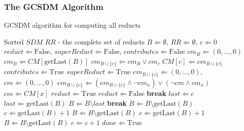 \documentclass[authoryear,11pt]{elsarticle}
\begin{document}
\subsubsection{The GCSDM Algorithm}	
	
	\begin{algorithm}
	\caption{GCSDM algorithm for computing all reducts}
	\label{alg:GCSDM}
	\begin{algorithmic}[1]
	  \Require Sorted $SDM$
      \Ensure $RR$ - the complete set of reducts
	  \State $B \Leftarrow \emptyset$, $RR \Leftarrow \emptyset$, $c \Leftarrow 0$
	  \State $reduct \Leftarrow \mathrm{False}$, $superReduct \Leftarrow \mathrm{False}$, 
	  		 $contributes \Leftarrow \mathrm{False}$
	  	\label{line:singleT}
	  		\State $cm_B \Leftarrow (0,...,0)$
	  	\Else
	  		\State $cm_B \Leftarrow CM[\mathrm{getLast}(B)]$
	  	\EndIf
	  	\State $cm_{B\cup \lbrace c\rbrace} \Leftarrow cm_B \vee cm_c$
	  	\State $CM[c] \Leftarrow cm_{B\cup \lbrace c\rbrace}$
	  	\label{line:contrib}
	  		\State $contributes \Leftarrow \mathrm{True}$
	  			\State $superReduct \Leftarrow \mathrm{True}$
	  			\State $em_{B\cup \lbrace c\rbrace} \Leftarrow (0,...,0)$, $cm \Leftarrow (0,...,0)$
	  				\State $em_{B\cup \lbrace c\rbrace} \Leftarrow (em_{B\cup \lbrace c\rbrace}\wedge \neg 
	  						cm_x) \vee (\neg cm \wedge cm_x)$
	  				\State $cm \Leftarrow CM[x]$
	  			\EndFor
	  			\State $reduct \Leftarrow \mathrm{True}$
	  					\State $reduct \Leftarrow \mathrm{False}$
	  					\State \textbf{break}
	  				\EndIf
	  			\EndFor
	  		\EndIf
	  	\EndIf
	  	 
	  		 
	  			\State $last \Leftarrow c$
	  				\State $last \Leftarrow \mathrm{getLast}(B)$
	  				\State $B \Leftarrow B\setminus last$
	  					\State \textbf{break}
	  				\EndIf
	  			\EndWhile
	  		\Else
	  			\State $B \Leftarrow B\setminus \mathrm{getLast}(B)$
	  		\EndIf
	  		\State $c \Leftarrow  \mathrm{getLast}(B)+1$
	  		\State $B \Leftarrow B\setminus \mathrm{getLast}(B)$
	  	\Else
	  			\State $c \Leftarrow \mathrm{getLast}(B)+1$
	  			\State $B \Leftarrow B\setminus \mathrm{getLast}(B)$
	  		 \EndIf
	  		 	\State $c \Leftarrow c+1$
	  		 \EndIf
	  	\EndIf
	  	 
	  		\State $done \Leftarrow \mathrm{True}$
	  	\EndIf
	  \EndWhile 
	\end{algorithmic}
	\end{algorithm}
	
\newpage 
{}

\end{document}

